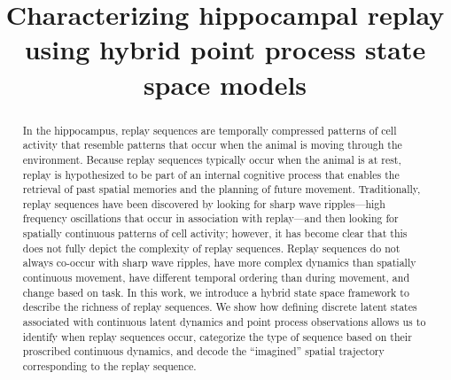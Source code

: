 \documentclass[conference]{IEEEtran}
\begin{document}
\title{Characterizing hippocampal replay using hybrid point process state space models}

\author{
\and
{}
\and
{}

}

\maketitle

\begin{abstract}
In the hippocampus, replay sequences are temporally compressed patterns of cell activity that resemble patterns that occur when the animal is moving through the environment. Because replay sequences typically occur when the animal is at rest, replay is hypothesized to be part of an internal cognitive process that enables the retrieval of past spatial memories and the planning of future movement. Traditionally, replay sequences have been discovered by looking for sharp wave ripples---high frequency oscillations that occur in association with replay---and then looking for spatially continuous patterns of cell activity; however, it has become clear that this does not fully depict the complexity of replay sequences. Replay sequences do not always co-occur with sharp wave ripples, have more complex dynamics than spatially continuous movement, have different temporal ordering than during movement, and change based on task. In this work, we introduce a hybrid state space framework to describe the richness of replay sequences. We show how defining discrete latent states associated with continuous latent dynamics and point process observations allows us to identify when replay sequences occur, categorize the type of sequence based on their proscribed continuous dynamics, and decode the “imagined” spatial trajectory corresponding to the replay sequence.

\end{abstract}
\end{document}

